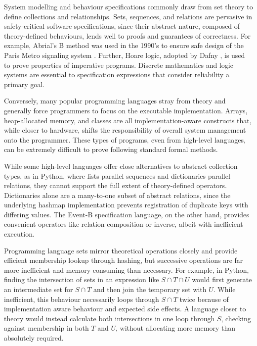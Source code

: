 \documentclass[12pt]{article}
\begin{document}
System modelling and behaviour specifications commonly draw from set theory to define collections and relationships. Sets, sequences, and relations are pervasive in safety-critical software specifications, since their abstract nature, composed of theory-defined behaviours, lends well to proofs and guarantees of correctness. For example, Abrial's B method \cite{abrial2010modeling} was used in the 1990's to ensure safe design of the Paris Metro signaling system \cite{gerhart1994ParisMetro}. Further, Hoare logic, adopted by Dafny \cite{leino2023program}, is used to prove properties of imperative programs. Discrete mathematics and logic systems are essential to specification expressions that consider reliability a primary goal.

Conversely, many popular programming languages stray from theory and generally force programmers to focus on the executable implementation. Arrays, heap-allocated memory, and classes are all implementation-aware constructs that, while closer to hardware, shifts the responsibility of overall system management onto the programmer. These types of programs, even from high-level languages, can be extremely difficult to prove following standard formal methods.

While some high-level languages offer close alternatives to abstract collection types, as in Python, where lists parallel sequences and dictionaries parallel relations, they cannot support the full extent of theory-defined operators. Dictionaries alone are a many-to-one subset of abstract relations, since the underlying hashmap implementation prevents registration of duplicate keys with differing values. The Event-B specification language, on the other hand, provides convenient operators like relation composition or inverse, albeit with inefficient execution.

Programming language sets mirror theoretical operations closely and provide efficient membership lookup through hashing, but successive operations are far more inefficient and memory-consuming than necessary. For example, in Python, finding the intersection of sets in an expression like $S \cap T \cap U$ would first generate an intermediate set for $S \cap T$ and then join the temporary set with $U$. While inefficient, this behaviour necessarily loops through $S \cap T$ twice because of implementation aware behaviour and expected side effects. A language closer to theory would instead calculate both intersections in one loop through $S$, checking against membership in both $T$ and $U$, without allocating more memory than absolutely required.
\end{document}
